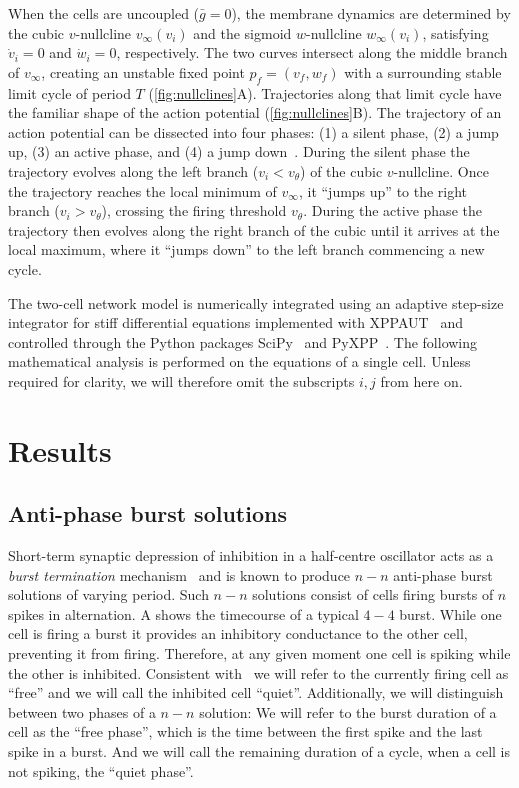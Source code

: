 \documentclass[utf8]{frontiersFPHY} %
\newcommand{\gbar}{\bar g}
\begin{document}
When the cells are uncoupled ($\gbar=0$), the membrane dynamics are determined by the cubic $v$-nullcline $v_{\infty}(v_i)$ and the sigmoid $w$-nullcline $w_{\infty}(v_{i})$, satisfying $\dot v_{i}=0$ and $\dot w_{i}=0$, respectively.
The two curves intersect along the middle branch of $v_{\infty}$, creating an unstable fixed point $p_{f}=(v_{f},w_{f})$ with a surrounding stable limit cycle of period $T$ (\cref{fig:nullclines}A).
Trajectories along that limit cycle have the familiar shape of the action potential (\cref{fig:nullclines}B).
The trajectory of an action potential can be dissected into four phases: (1) a silent phase, (2) a jump up, (3) an active phase, and (4) a jump down~\citep[see e.g.][]{ermentrout2010}.
During the silent phase the trajectory evolves along the left branch ($v_{i}<v_{\theta}$) of the cubic $v$-nullcline.
Once the trajectory reaches the local minimum of $v_{\infty}$, it ``jumps up'' to the right branch ($v_{i}>v_{\theta}$), crossing the firing threshold $v_{\theta}$.
During the active phase the trajectory then evolves along the right branch of the cubic until it arrives at the local maximum, where it ``jumps down'' to the left branch commencing a new cycle.

The two-cell network model is numerically integrated using an adaptive step-size integrator for stiff differential equations implemented with XPPAUT~\citep{ermentrout2002} and controlled through the Python packages SciPy~\citep{scipy2020} and PyXPP~\citep{pyxpp}.
The following mathematical analysis is performed on the equations of a single cell.
Unless required for clarity, we will therefore omit the subscripts $i,j$ from here on.

\section{Results}
\subsection{Anti-phase burst solutions}
Short-term synaptic depression of inhibition in a half-centre oscillator acts as a \emph{burst termination} mechanism~\citep{brown1911} and is known to produce $n-n$ anti-phase burst solutions of varying period.
Such $n-n$ solutions consist of cells firing bursts of $n$ spikes in alternation.
A shows the timecourse of a typical $4-4$ burst.
While one cell is firing a burst it provides an inhibitory conductance to the other cell,  preventing it from firing.
Therefore, at any given moment one cell is spiking while the other is inhibited.
Consistent with~\citet{bose2011} we will refer to the currently firing cell as ``free'' and we will call the inhibited cell ``quiet''.
Additionally, we will distinguish between two phases of a $n-n$ solution:
We will refer to the burst duration of a cell as the ``free phase'', which is the time between the first spike and the last spike in a burst. And we will call the remaining duration of a cycle, when a cell is not spiking, the ``quiet phase''.
\end{document}

